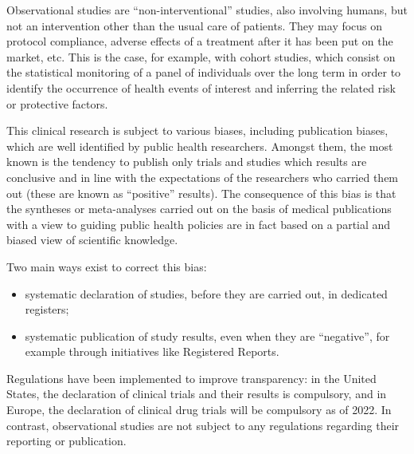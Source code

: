 \documentclass[
]{article}
\begin{document}
Observational studies are ``non-interventional'' studies, also involving
humans, but not an intervention other than the usual care of patients.
They may focus on protocol compliance, adverse effects of a treatment
after it has been put on the market, etc. This is the case, for example,
with cohort studies, which consist on the statistical monitoring of a
panel of individuals over the long term in order to identify the
occurrence of health events of interest and inferring the related risk
or protective factors.

This clinical research is subject to various biases, including
publication biases, which are well identified by public health
researchers. Amongst them, the most known is the tendency to publish
only trials and studies which results are conclusive and in line with
the expectations of the researchers who carried them out (these are
known as ``positive'' results). The consequence of this bias is that the
syntheses or meta-analyses carried out on the basis of medical
publications with a view to guiding public health policies are in fact
based on a partial and biased view of scientific knowledge.

Two main ways exist to correct this bias:

\begin{itemize}
\item
  systematic declaration of studies, before they are carried out, in
  dedicated registers;
\item
  systematic publication of study results, even when they are
  ``negative'', for example through initiatives like Registered Reports.
\end{itemize}

Regulations have been implemented to improve transparency: in the United
States, the declaration of clinical trials and their results is
compulsory, and in Europe, the declaration of clinical drug trials will
be compulsory as of 2022. In contrast, observational studies are not
subject to any regulations regarding their reporting or publication.
\end{document}
